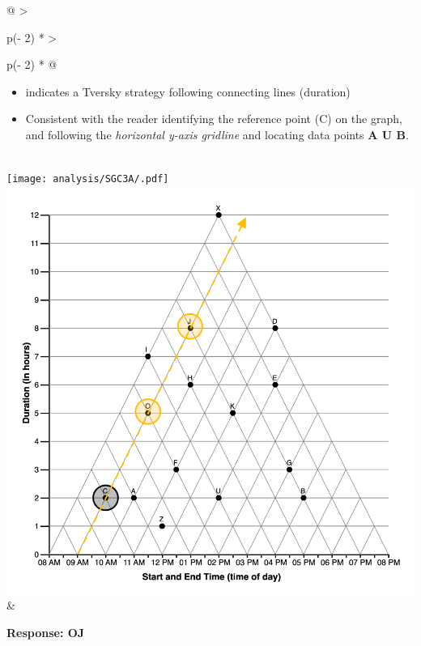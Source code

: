 \documentclass[
  letterpaper,
  DIV=11,
  numbers=noendperiod]{scrreprt}
\providecommand{\tightlist}{%
  \setlength{\itemsep}{0pt}\setlength{\parskip}{0pt}}\usepackage{longtable,booktabs,array}
\begin{document}
\begin{longtable}[]{@{}
  >{\raggedright\arraybackslash}p{(\columnwidth - 2\tabcolsep) * }
  >{\raggedright\arraybackslash}p{(\columnwidth - 2\tabcolsep) * }@{}}
\begin{minipage}[t]{\linewidth}
\begin{itemize}
\tightlist
\item
  indicates a Tversky strategy following connecting lines (duration)
\item
  Consistent with the reader identifying the reference point (C) on the
  graph, and following the \emph{horizontal y-axis gridline} and
  locating data points \textbf{A U B}.
\end{itemize}
\end{minipage} \\
\texttt{[image: analysis/SGC3A/.pdf]}\includegraphics{analysis/SGC3A/static/interpretations/Q3_111_OJ.png}
& \begin{minipage}[t]{\linewidth}\raggedright
\textbf{Response: OJ}


\end{minipage}
\end{longtable}
\end{document}
